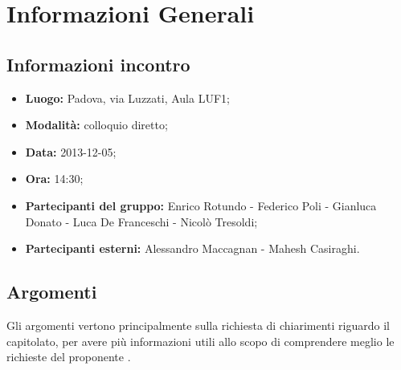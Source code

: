 \section{Informazioni Generali}
	\subsection{Informazioni incontro}
	\begin{itemize}
		\item {\bfseries Luogo:} Padova, via Luzzati, Aula LUF1;
		\item {\bfseries Modalità:} colloquio diretto;
		\item {\bfseries Data:} 2013-12-05;
		\item {\bfseries Ora:} 14:30;
		\item {\bfseries Partecipanti del gruppo:} Enrico Rotundo - Federico Poli - Gianluca Donato - Luca De Franceschi - Nicolò Tresoldi;
		\item {\bfseries Partecipanti esterni:} Alessandro Maccagnan - Mahesh Casiraghi.
	\end{itemize}
	
	\subsection{Argomenti}
		Gli argomenti vertono principalmente sulla richiesta di chiarimenti riguardo il capitolato, per avere più informazioni utili allo scopo di comprendere meglio le richieste del proponente \Proponente{}.